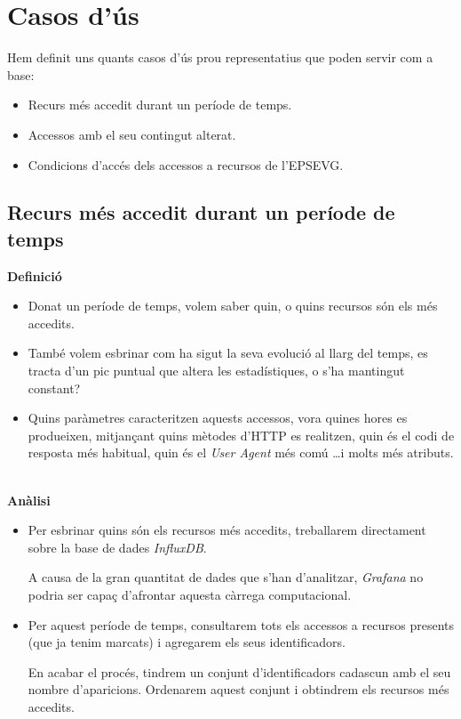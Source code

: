 \section{Casos d'ús}\label{sec:analysis-visualization-use-cases}

Hem definit uns quants casos d'ús prou representatius que poden servir com a base:

\begin{itemize}
    \item Recurs més accedit durant un període de temps.
    \item Accessos amb el seu contingut alterat.
    \item Condicions d'accés dels accessos a recursos de l'EPSEVG.
\end{itemize}

\subsection{Recurs més accedit durant un període de temps}\label{subsec:most-accessed-resource}

\textbf{Definició}

\begin{itemize}
    \item Donat un període de temps, volem saber quin, o quins recursos són els més accedits.
    \item També volem esbrinar com ha sigut la seva evolució al llarg del temps, es tracta d'un pic puntual que altera les estadístiques, o s'ha mantingut constant?
    \item Quins paràmetres caracteritzen aquests accessos, vora quines hores es produeixen, mitjançant quins mètodes d'\gls{HTTP} es realitzen, quin és el codi de resposta més habitual, quin és el \textit{User Agent} més comú \dots i molts més atributs.
\end{itemize}

\noindent \\
\textbf{Anàlisi}

\begin{itemize}
    \item Per esbrinar quins són els recursos més accedits, treballarem directament sobre la base de dades \textit{InfluxDB}.

    A causa de la gran quantitat de dades que s'han d'analitzar, \textit{Grafana} no podria ser capaç d'afrontar aquesta càrrega computacional.

    \item Per aquest període de temps, consultarem tots els accessos a recursos presents (que ja tenim marcats) i agregarem els seus identificadors.

    En acabar el procés, tindrem un conjunt d'identificadors cadascun amb el seu nombre d'aparicions.
    Ordenarem aquest conjunt i obtindrem els recursos més accedits.
\end{itemize}

